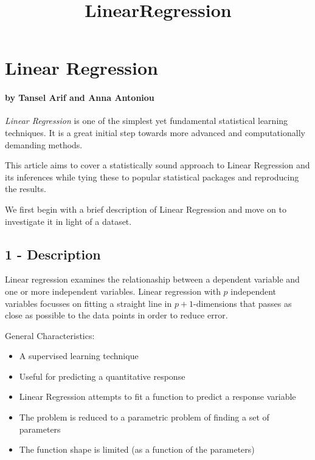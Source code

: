 \documentclass[11pt]{article}
\title{LinearRegression}
\providecommand{\tightlist}{%
      \setlength{\itemsep}{0pt}\setlength{\parskip}{0pt}}
\begin{document}
    
    
    \maketitle
    
    

    
    \hypertarget{linear-regression}{%
\section{Linear Regression}\label{linear-regression}}

\hypertarget{by-tansel-arif-and-anna-antoniou}{%
\paragraph{by Tansel Arif and Anna
Antoniou}\label{by-tansel-arif-and-anna-antoniou}}

\emph{Linear Regression} is one of the simplest yet fundamental
statistical learning techniques. It is a great initial step towards more
advanced and computationally demanding methods.

This article aims to cover a statistically sound approach to Linear
Regression and its inferences while tying these to popular statistical
packages and reproducing the results.

We first begin with a brief description of Linear Regression and move on
to investigate it in light of a dataset.

    \hypertarget{description}{%
\subsection{1 - Description}\label{description}}

Linear regression examines the relationaship between a dependent
variable and one or more independent variables. Linear regression with
\(p\) independent variables focusses on fitting a straight line in
\(p+1\)-dimensions that passes as close as possible to the data points
in order to reduce error.

General Characteristics:

\begin{itemize}
\tightlist
\item
  A supervised learning technique
\item
  Useful for predicting a quantitative response
\item
  Linear Regression attempts to fit a function to predict a response
  variable
\item
  The problem is reduced to a parametric problem of finding a set of
  parameters
\item
  The function shape is limited (as a function of the parameters)
\end{itemize}
\end{document}
